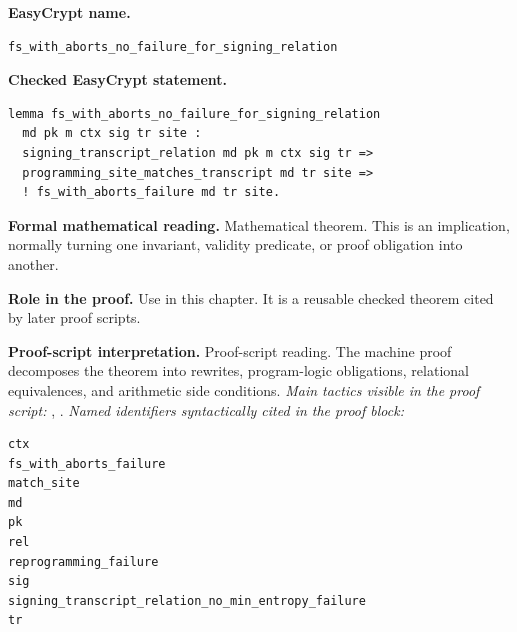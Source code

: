 \begin{formaltheorem}
\noindent\textbf{EasyCrypt name.}
\begin{lstlisting}[language=EasyCrypt,basicstyle=\ttfamily\scriptsize]
fs_with_aborts_no_failure_for_signing_relation
\end{lstlisting}
\noindent\textbf{Checked EasyCrypt statement.}
\begin{lstlisting}[language=EasyCrypt,basicstyle=\ttfamily\scriptsize]
lemma fs_with_aborts_no_failure_for_signing_relation
  md pk m ctx sig tr site :
  signing_transcript_relation md pk m ctx sig tr =>
  programming_site_matches_transcript md tr site =>
  ! fs_with_aborts_failure md tr site.
\end{lstlisting}
\noindent\textbf{Formal mathematical reading.}
Mathematical theorem. This is an implication, normally turning one invariant, validity predicate, or proof obligation into another.

\noindent\textbf{Role in the proof.}
Use in this chapter. It is a reusable checked theorem cited by later proof scripts.

\noindent\textbf{Proof-script interpretation.}
Proof-script reading. The machine proof decomposes the theorem into rewrites, program-logic obligations, relational equivalences, and arithmetic side conditions.
\emph{Main tactics visible in the proof script:} , .
\emph{Named identifiers syntactically cited in the proof block:}
\begin{lstlisting}[language=EasyCrypt,basicstyle=\ttfamily\scriptsize]
ctx
fs_with_aborts_failure
match_site
md
pk
rel
reprogramming_failure
sig
signing_transcript_relation_no_min_entropy_failure
tr
\end{lstlisting}

\end{formaltheorem}

